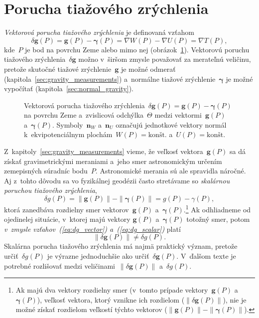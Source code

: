 \documentclass[a4paper, 12pt]{book}
\let\vec\mathbf
\begin{document}
\section{Porucha tiažového zrýchlenia}
\label{sec:gravity_disturbance}

\emph{Vektorová porucha tiažového zrýchlenia} je definovaná vzťahom
%
\begin{equation}
\label{eq:dg_vector}
\delta \vec g(P) = \vec g(P) - \boldsymbol \gamma(P) = \nabla W(P) - \nabla 
U(P) = \nabla T(P){,}
\end{equation}
%
kde~$P$ je bod na povrchu Zeme alebo mimo nej 
(obrázok~\ref{fig:gravity_disturbance}).  Vektorovú poruchu tiažového 
zrýchlenia~$\delta \vec g$ možno v~širšom zmysle považovať za merateľnú 
veličinu, pretože skutočné tiažové zrýchlenie~$\vec g$ je možné odmerať 
(kapitola~\ref{sec:gravity_measurements}) a~normálne tiažové 
zrýchlenie~$\boldsymbol\gamma$ je možné vypočítať 
(kapitola~\ref{sec:normal_gravity}).

\begin{figure}
\centering

\caption{Vektorová porucha tiažového zrýchlenia~$\delta \vec g(P) = \vec g(P) 
- \boldsymbol\gamma(P)$ na povrchu Zeme a~zvislicová odchýlka~$\Theta$ medzi 
vektormi~$\vec g(P)$ a~$\boldsymbol\gamma(P)$.  Symboly~$\vec n_W$ a~$\vec n_U$ 
označujú jednotkové vektory normál k~ekvipotenciálnym plochám~$W(P) 
= \textrm{kon\v{s}t.}$ a~$U(P) = \textrm{kon\v{s}t.}$}
\label{fig:gravity_disturbance}
\end{figure}

Z~kapitoly~\ref{sec:gravity_measurements} vieme, že veľkosť vektora~$\vec g(P)$ 
sa dá získať gravimetrickými meraniami a~jeho smer astronomickým určením 
zemepisných súradníc bodu~$P$.  Astronomické merania sú ale spravidla náročné.  
Aj z~tohto dôvodu sa vo fyzikálnej geodézii často stretávame so \emph{skalárnou 
poruchou tiažového zrýchlenia},
%
\begin{equation}
\label{eq:dg_scalar}
\delta g(P) = \| \vec g(P) \| - \| \boldsymbol \gamma(P) \| = g(P) 
- \gamma(P){,}
\end{equation}
%
ktorá zanedbáva rozdielny smer vektorov~$\vec g(P)$ a~$\boldsymbol 
\gamma(P)$.\footnote{Ak majú dva vektory rozdielny smer (v~tomto prípade 
vektory~$\vec g(P)$ a~$\boldsymbol \gamma(P)$), veľkosť vektora, ktorý vznikne 
ich rozdielom ($\| \delta \vec g(P) \|$), nie je možné získať rozdielom 
veľkostí týchto vektorov ($\| \vec g(P) \| - \| \boldsymbol \gamma(P) \|$).}  
Ak odhliadneme od ojedinelej situácie, v~ktorej majú vektory $\vec g(P)$ 
a~$\boldsymbol{\gamma}(P)$ totožný smer, potom \emph{v~zmysle 
vzťahov~(\ref{eq:dg_vector}) a~(\ref{eq:dg_scalar})} platí
%
\begin{equation}
\| \delta \vec g(P) \| \neq \delta g(P){.}
\end{equation}
%
Skalárna porucha tiažového zrýchlenia má najmä praktický význam, pretože 
určiť~$\delta g(P)$ je výrazne jednoduchšie ako určiť~$\delta \vec g(P)$.  
V~ďalšom texte je potrebné rozlišovať medzi veličinami~$\| \delta \vec g(P) \|$ 
a~$\delta g(P)$.
\end{document}
